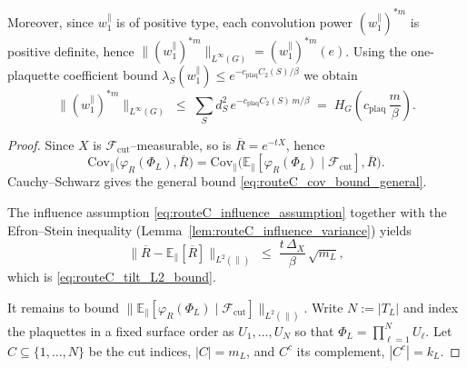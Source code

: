 \begin{lemma}
Moreover, since $w_1^{\parallel}$ is of positive type, each convolution power $(w_1^{\parallel})^{*m}$ is positive definite,
hence $\|(w_1^{\parallel})^{*m}\|_{L^\infty(G)}=(w_1^{\parallel})^{*m}(e)$.
Using the one-plaquette coefficient bound $\lambda_S(w_1^{\parallel})\le e^{-c_{\mathrm{plaq}}C_2(S)/\beta}$ we obtain
\begin{equation}\label{eq:routeC_wm_sup_heatkernel}
\big\|(w_1^{\parallel})^{*m}\big\|_{L^\infty(G)}
\;\le\;
\sum_{S} d_S^2\,e^{-c_{\mathrm{plaq}} C_2(S)\,m/\beta}
\;=\;
H_G\!\left(c_{\mathrm{plaq}}\,\frac{m}{\beta}\right).
\end{equation}

\end{lemma}

\begin{proof}
Since $X$ is $\mathcal F_{\mathrm{cut}}$--measurable, so is $\overline R=e^{-tX}$, hence
\[
\mathrm{Cov}_{\parallel}\big(\varphi_R(\Phi_L),\overline R\big)
=\mathrm{Cov}_{\parallel}\Big(\mathbb E_{\parallel}[\varphi_R(\Phi_L)\mid\mathcal F_{\mathrm{cut}}],\overline R\Big).
\]
Cauchy--Schwarz gives the general bound \eqref{eq:routeC_cov_bound_general}.

The influence assumption \eqref{eq:routeC_influence_assumption} together with the Efron--Stein inequality
(Lemma~\ref{lem:routeC_influence_variance}) yields
\begin{equation}\label{eq:routeC_tilt_L2_bound_proof}
\big\|\overline R-\mathbb E_{\parallel}[\overline R]\big\|_{L^2(\parallel)}
\;\le\;\frac{t\,\Delta_X}{\beta}\,\sqrt{m_L},
\end{equation}
which is \eqref{eq:routeC_tilt_L2_bound}.

It remains to bound $\|\mathbb E_{\parallel}[\varphi_R(\Phi_L)\mid\mathcal F_{\mathrm{cut}}]\|_{L^2(\parallel)}$.
Write $N:=|T_L|$ and index the plaquettes in a fixed surface order as $U_1,\dots,U_N$ so that
$\Phi_L=\prod_{\ell=1}^{N} U_\ell$.
Let $C\subseteq\{1,\dots,N\}$ be the cut indices, $|C|=m_L$, and $C^c$ its complement, $|C^c|=k_L$.


\end{proof}
